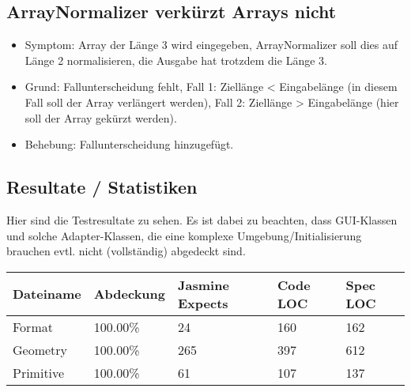 \documentclass[qualitaetssicherung.tex]{subfiles}
\begin{document}
	\subsection{ArrayNormalizer verkürzt Arrays nicht}
		\begin{itemize}
			\item
			Symptom: Array der Länge 3 wird eingegeben, ArrayNormalizer soll dies auf Länge 2 normalisieren, die Ausgabe hat trotzdem die Länge 3.
			\item
			Grund: Fallunterscheidung fehlt, Fall 1: Ziellänge < Eingabelänge (in diesem Fall soll der Array verlängert werden), Fall 2: Ziellänge > Eingabelänge (hier soll der Array gekürzt werden).
			\item
			Behebung: Fallunterscheidung hinzugefügt.
		\end{itemize}
		
		\subsection*{Resultate / Statistiken}
		Hier sind die Testresultate zu sehen. Es ist dabei zu beachten, dass GUI-Klassen und solche Adapter-Klassen, die eine komplexe Umgebung/Initialisierung brauchen evtl. nicht (vollständig) abgedeckt sind.
			\begin{center}
					\begin{tabular}{| l | l | l | l | l |}
					\hline
					Dateiname & Abdeckung & Jasmine Expects & Code LOC & Spec LOC\\ \hline
					Format & 100.00\% & 24 & 160 & 162\\ \hline
					Geometry & 100.00\% & 265 & 397 & 612 \\ \hline
					Primitive & 100.00\% & 61 & 107 & 137\\ \hline
					\hline
					\end{tabular}
			\end{center}
\end{document}
